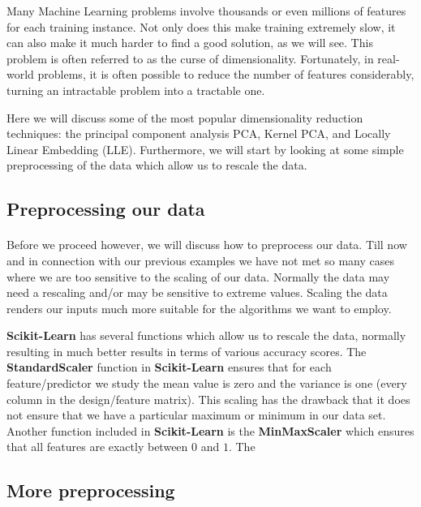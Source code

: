\documentclass[%
oneside,                 %
final,                   %
10pt]{article}
\begin{document}
Many Machine Learning problems involve thousands or even millions of
features for each training instance. Not only does this make training
extremely slow, it can also make it much harder to find a good
solution, as we will see. This problem is often referred to as the
curse of dimensionality.  Fortunately, in real-world problems, it is
often possible to reduce the number of features considerably, turning
an intractable problem into a tractable one.

Here we will discuss some of the most popular dimensionality reduction
techniques: the principal component analysis PCA, Kernel PCA, and
Locally Linear Embedding (LLE).  Furthermore, we will start by looking
at some simple preprocessing of the data which allow us to rescale the
data.




\subsection{Preprocessing our data}

\paragraph{}

Before we proceed however, we will discuss how to preprocess our
data. Till now and in connection with our previous examples we have
not met so many cases where we are too sensitive to the scaling of our
data. Normally the data may need a rescaling and/or may be sensitive
to extreme values. Scaling the data renders our inputs much more
suitable for the algorithms we want to employ.

\textbf{Scikit-Learn} has several functions which allow us to rescale the
data, normally resulting in much better results in terms of various
accuracy scores.  The \textbf{StandardScaler} function in \textbf{Scikit-Learn}
ensures that for each feature/predictor we study the mean value is
zero and the variance is one (every column in the design/feature
matrix).  This scaling has the drawback that it does not ensure that
we have a particular maximum or minimum in our data set. Another
function included in \textbf{Scikit-Learn} is the \textbf{MinMaxScaler} which
ensures that all features are exactly between $0$ and $1$. The

\subsection{More preprocessing}
\end{document}
